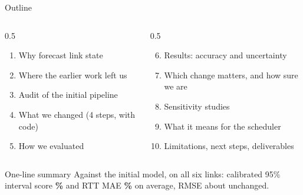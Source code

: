 \documentclass[aspectratio=169,11pt]{beamer}
\newcommand{\good}[1]{\textcolor{Good}{\textbf{#1}}}
\begin{document}
\begin{frame}{Outline}
  \begin{columns}[T,onlytextwidth]
  \begin{column}{0.5\textwidth}
  \begin{enumerate}
    \item Why forecast link state
    \item Where the earlier work left us
    \item Audit of the initial pipeline
    \item What we changed (4 steps, with code)
    \item How we evaluated
  \end{enumerate}
  \end{column}
  \begin{column}{0.5\textwidth}
  \begin{enumerate}\setcounter{enumi}{5}
    \item Results: accuracy and uncertainty
    \item Which change matters, and how sure we are
    \item Sensitivity studies
    \item What it means for the scheduler
    \item Limitations, next steps, deliverables
  \end{enumerate}
  \end{column}
  \end{columns}
  \vspace{0.6cm}
  \begin{block}{One-line summary}
  Against the initial model, on all six links: calibrated 95\% interval score \good{\ChgMISMean\%} and RTT MAE \good{\ChgMAEMean\%} on average, RMSE about unchanged.
  \end{block}
\end{frame}
\end{document}
